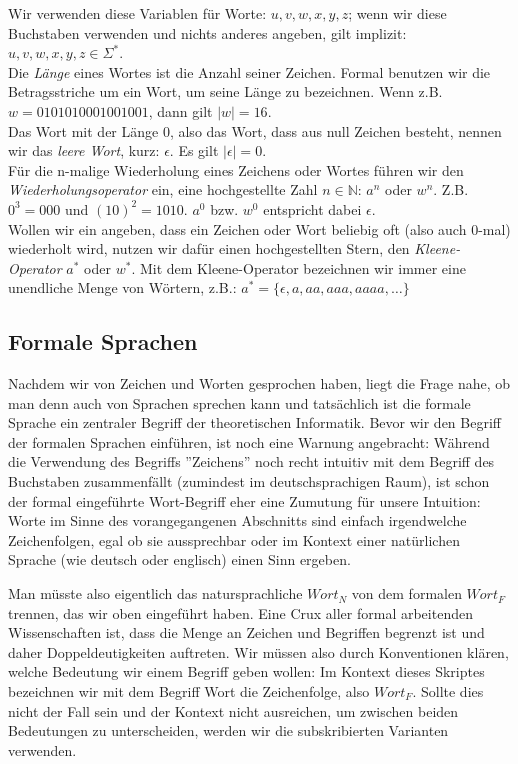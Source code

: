 \noindent
Wir verwenden diese Variablen für Worte:
$u, v, w, x, y, z$; wenn wir diese Buchstaben verwenden und nichts anderes angeben,
gilt implizit: $u, v, w, x, y, z \in \Sigma^*$.\\

\noindent
Die \emph{Länge} eines Wortes ist die Anzahl seiner Zeichen.
Formal benutzen wir die Betragsstriche um ein Wort, um seine
Länge zu bezeichnen. Wenn z.B. $w = 0101010001001001$, dann gilt $|w| = 16$.\\

\noindent
Das Wort mit der Länge 0, also das Wort, dass aus null Zeichen besteht,
nennen wir das \emph{leere Wort}, kurz: $\epsilon$.
Es gilt $|\epsilon| = 0$.\\

\noindent
Für die n-malige Wiederholung eines Zeichens oder Wortes führen wir den \emph{Wiederholungsoperator}
ein, eine hochgestellte Zahl $n \in \mathbb{N}$: $a^n$ oder $w^n$.
Z.B. $0^3 = 000$ und $(10)^2 = 1010$.
$a^0$ bzw. $w^0$ entspricht dabei $\epsilon$.\\

\noindent
Wollen wir ein angeben, dass ein Zeichen oder Wort beliebig oft (also auch 0-mal) wiederholt
wird, nutzen wir dafür einen hochgestellten Stern, den \emph{Kleene-Operator} $a^*$ oder $w^*$.
Mit dem Kleene-Operator bezeichnen wir immer eine unendliche Menge von Wörtern, z.B.:
$a^* = \{\epsilon, a, aa, aaa, aaaa, \dots\}$

\subsection{Formale Sprachen}

Nachdem wir von Zeichen und Worten gesprochen haben, liegt die Frage nahe,
ob man denn auch von Sprachen sprechen kann und tatsächlich ist die formale Sprache 
ein zentraler Begriff der theoretischen Informatik.
Bevor wir den Begriff der formalen Sprachen einführen, ist noch eine Warnung angebracht:
Während die Verwendung des Begriffs ''Zeichens''
noch recht intuitiv mit dem Begriff des Buchstaben zusammenfällt
(zumindest im deutschsprachigen Raum),
ist schon der formal eingeführte Wort-Begriff eher eine Zumutung für unsere Intuition:
Worte im Sinne des vorangegangenen Abschnitts sind einfach irgendwelche Zeichenfolgen,
egal ob sie aussprechbar oder im Kontext einer natürlichen Sprache
(wie deutsch oder englisch) einen Sinn ergeben.

Man müsste also eigentlich das natursprachliche $Wort_N$ von dem formalen $Wort_F$ trennen,
das wir oben eingeführt haben.
Eine Crux aller formal arbeitenden Wissenschaften ist,
dass die Menge an Zeichen und Begriffen begrenzt ist und daher Doppeldeutigkeiten auftreten.
Wir müssen also durch Konventionen klären, welche Bedeutung wir einem Begriff geben wollen:
Im Kontext dieses Skriptes bezeichnen wir mit dem Begriff Wort die Zeichenfolge, also $Wort_F$.
Sollte dies nicht der Fall sein und der Kontext nicht ausreichen,
um zwischen beiden Bedeutungen zu unterscheiden,
werden wir die subskribierten Varianten verwenden.

